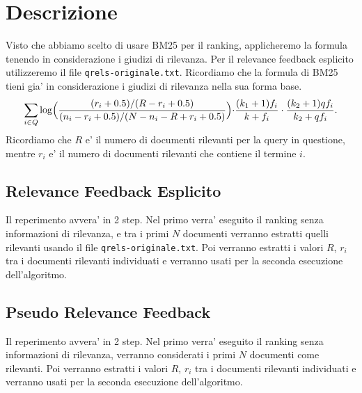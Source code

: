 \documentclass[12pt]{article}
\begin{document}
\maketitle

\section{Descrizione}

Visto che abbiamo scelto di usare BM25 per il ranking, applicheremo la formula tenendo in considerazione i giudizi di rilevanza. Per il relevance feedback esplicito utilizzeremo il file \texttt{qrels-originale.txt}. Ricordiamo che la formula di BM25 tieni gia' in considerazione i giudizi di rilevanza nella sua forma base. 
\[ \sum\limits_{i \in Q}\log\Bigl(\frac{(r_i+0.5)/(R-r_i+0.5)}{(n_i-r_i+0.5)/(N-n_i-R+r_i+0.5)}\Bigl)\cdot\frac{(k_1+1)f_i}{k+f_i}\cdot\frac{(k_2+1)qf_i}{k_2+qf_i}. \]
Ricordiamo che $R$ e' il numero di documenti rilevanti per la query in questione, mentre $r_i$ e' il numero di documenti rilevanti che contiene il termine $i$.

\subsection{Relevance Feedback Esplicito}
Il reperimento avvera' in 2 step. Nel primo verra' eseguito il ranking senza informazioni di rilevanza, e tra i primi $N$ documenti verranno estratti quelli rilevanti usando il file \texttt{qrels-originale.txt}. Poi verranno estratti i valori $R$, $r_i$ tra i documenti rilevanti individuati e verranno usati per la seconda esecuzione dell'algoritmo.

\subsection{Pseudo Relevance Feedback}
Il reperimento avvera' in 2 step. Nel primo verra' eseguito il ranking senza informazioni di rilevanza, verranno considerati i primi $N$ documenti come rilevanti. Poi verranno estratti i valori $R$, $r_i$ tra i documenti rilevanti individuati e verranno usati per la seconda esecuzione dell'algoritmo.
\end{document}

